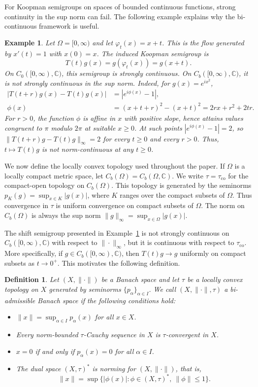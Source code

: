 \documentclass[preprint,1p,times,nopreprintline]{elsarticle}
\newtheorem{definition}[theorem]{Definition}
\newtheorem{example}[theorem]{Example}
\begin{document}
For Koopman semigroups on spaces of bounded continuous functions, strong continuity in the sup norm can fail. The following example explains why the bi-continuous framework is useful.

\begin{example}
\label{nowhere}
Let $\Omega=[0,\infty)$ and let $\varphi_t(x)=x+t$. This is the flow generated by $x'(t)=1$ with $x(0)=x$. The induced Koopman semigroup is
\[
T(t)g(x)=g(\varphi_t(x))=g(x+t).
\]
On $C_0([0,\infty),\mathbb{C})$, this semigroup is strongly continuous. On $C_b([0,\infty),\mathbb{C})$, it is not strongly continuous in the sup norm. Indeed, for $g(x)=e^{ix^2}$,
\begin{align*}
|T(t+r)g(x)-T(t)g(x)|
&=
|e^{i\phi(x)}-1|,\\
\phi(x)&=(x+t+r)^2-(x+t)^2=2rx+r^2+2tr.
\end{align*}
For $r>0$, the function $\phi$ is affine in $x$ with positive slope, hence attains values congruent to $\pi$ modulo $2\pi$ at suitable $x\ge 0$. At such points $|e^{i\phi(x)}-1|=2$, so $\|T(t+r)g-T(t)g\|_\infty=2$ for every $t\ge 0$ and every $r>0$. Thus, $t\mapsto T(t)g$ is not norm-continuous at any $t\ge 0$.
\end{example}

We now define the locally convex topology used throughout the paper. If $\Omega$ is a locally compact metric space, let $C_b(\Omega)=C_b(\Omega,\mathbb{C})$. We write $\tau=\tau_{\mathrm{co}}$ for the compact-open topology on $C_b(\Omega)$. This topology is generated by the seminorms $p_K(g)=\sup_{x\in K}|g(x)|$, where $K$ ranges over the compact subsets of $\Omega$. Thus convergence in $\tau$ is uniform convergence on compact subsets of $\Omega$. The norm on $C_b(\Omega)$ is always the sup norm $\|g\|_\infty=\sup_{x\in\Omega}|g(x)|$.

The shift semigroup presented in Example~\ref{nowhere} is not strongly continuous on $C_b([0,\infty),\mathbb{C})$ with respect to $\|\cdot\|_\infty$, but it is continuous with respect to $\tau_{\mathrm{co}}$. More specifically, if $g\in C_b([0,\infty),\mathbb{C})$, then $T(t)g\to g$ uniformly on compact subsets as $t\to 0^+$. This motivates the following definition.

\begin{definition}
\label{Def:re-admissable}
Let $(X,\|\cdot\|)$ be a Banach space and let $\tau$ be a locally convex topology on $X$ generated by seminorms $\{p_\alpha\}_{\alpha\in I}$. We call $(X,\|\cdot\|,\tau)$ a bi-admissible Banach space if the following conditions hold:
\begin{itemize}
\item $\|x\|=\sup_{\alpha\in I}p_\alpha(x)$ for all $x\in X$.
\item Every norm-bounded $\tau$-Cauchy sequence in $X$ is $\tau$-convergent in $X$.
\item $x=0$ if and only if $p_\alpha(x)=0$ for all $\alpha\in I$.
\item The dual space $(X,\tau)^*$ is norming for $(X,\|\cdot\|)$, that is,
\[
\|x\|
=
\sup\{|\phi(x)|:\phi\in (X,\tau)^*,\ \|\phi\|\le 1\}.
\]
\end{itemize}
\end{definition}
\end{document}
